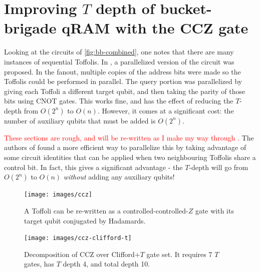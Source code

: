 \documentclass[a4paper,12pt]{article}
\newcommand\todo[1]{\textcolor{red}{#1}}
\begin{document}




\appendix


\section{Improving $T$ depth of bucket-brigade qRAM with the CCZ gate}

Looking at the circuits of \autoref{fig:bb-combined}, one notes that there are many instances of sequential Toffolis. 
In \cite{DiMatteo2020}, a parallelized version of the circuit was proposed. 
In the fanout, multiple copies of the address bits were made so the Toffolis could be performed in parallel. 
The query portion was parallelized by giving each Toffoli a different target qubit, and then taking the parity of those bits using CNOT gates. 
This works fine, and has the effect of reducing the $T$-depth from $O(2^n)$ to $O(n)$. 
However, it comes at a significant cost: the number of auxiliary qubits that must be added is $O(2^n)$.

\todo{These sections are rough, and will be re-written as I make my way through \cite{Alexandru2020}.}
The authors of \cite{Alexandru2020} found a more efficient way to parallelize this by taking advantage of some circuit identities that can be applied when two neighbouring Toffolis share a control bit. 
In fact, this gives a significant advantage - the $T$-depth will go from $O(2^n)$ to $O(n)$ \emph{without} adding any auxiliary qubits!

\begin{figure}[ht]
 \centering 
 \captionsetup{width=.89\linewidth}
 \texttt{[image: images/ccz]}
 \caption{A Toffoli can be re-written as a controlled-controlled-$Z$ gate with its target qubit conjugated by Hadamards.}
 \label{fig:ccz}
\end{figure}

\begin{figure}[ht]
 \centering
  \captionsetup{width=.89\linewidth}
 \texttt{[image: images/ccz-clifford-t]}
 \caption{Decomposition of CCZ over Clifford+$T$ gate set. It requires 7 $T$ gates, has $T$ depth 4, and total depth 10.}
 \label{fig:ccz-clifford-t}
\end{figure}
\end{document}
